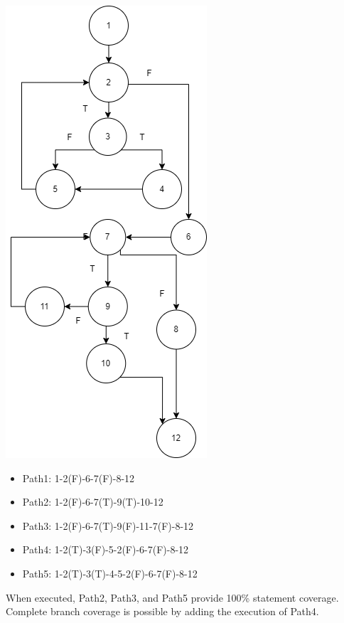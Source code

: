 \begin{marginfigure}[-8.5cm]
    \includegraphics{images/cfg-37.png}
    \caption{McCabe program graph for the \lstinline!isPalindrome! program.}
\end{marginfigure}

\begin{itemize}
        \item Path1: 1-2(F)-6-7(F)-8-12
        \item Path2: 1-2(F)-6-7(T)-9(T)-10-12
        \item Path3: 1-2(F)-6-7(T)-9(F)-11-7(F)-8-12
        \item Path4: 1-2(T)-3(F)-5-2(F)-6-7(F)-8-12 
        \item Path5: 1-2(T)-3(T)-4-5-2(F)-6-7(F)-8-12 
         
\end{itemize}
When executed, Path2, Path3, and Path5 provide 100\% statement coverage. Complete branch coverage is possible by adding the execution of Path4.

